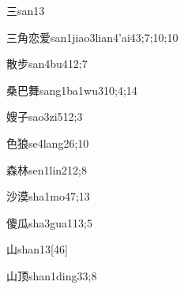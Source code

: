 
\begin{verbete}{三}{san1}{3}
\end{verbete}

\begin{verbete}{三角恋爱}{san1jiao3lian4'ai4}{3;7;10;10}
\end{verbete}

\begin{verbete}{散步}{san4bu4}{12;7}
\end{verbete}

\begin{verbete}{桑巴舞}{sang1ba1wu3}{10;4;14}
\end{verbete}

\begin{verbete}{嫂子}{sao3zi5}{12;3}
\end{verbete}

\begin{verbete}{色狼}{se4lang2}{6;10}
\end{verbete}

\begin{verbete}{森林}{sen1lin2}{12;8}
\end{verbete}

\begin{verbete}{沙漠}{sha1mo4}{7;13}
\end{verbete}

\begin{verbete}{傻瓜}{sha3gua1}{13;5}
\end{verbete}

\begin{verbete}{山}{shan1}{3}[46]
\end{verbete}

\begin{verbete}{山顶}{shan1ding3}{3;8}
\end{verbete}

